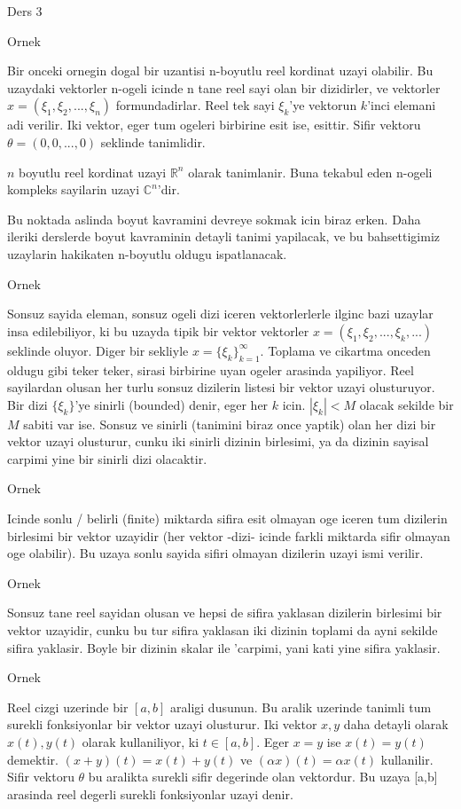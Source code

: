 \documentclass[12pt,fleqn]{article}\usepackage{../common}
\begin{document}
Ders 3

Ornek 

Bir onceki ornegin dogal bir uzantisi n-boyutlu reel kordinat uzayi
olabilir. Bu uzaydaki vektorler n-ogeli icinde n tane reel sayi olan bir
dizidirler, ve vektorler $x = (\xi_1, \xi_2,...,\xi_n)$
formundadirlar. Reel tek sayi $\xi_k$'ye vektorun $k$'inci elemani adi
verilir. Iki vektor, eger tum ogeleri birbirine esit ise, esittir. Sifir
vektoru $\theta = (0,0,...,0)$ seklinde tanimlidir. 

$n$ boyutlu reel kordinat uzayi $\mathbb{R}^n$ olarak tanimlanir. Buna tekabul eden
n-ogeli kompleks sayilarin uzayi $\mathbb{C}^n$'dir. 

Bu noktada aslinda boyut kavramini devreye sokmak icin biraz erken. Daha
ileriki derslerde boyut kavraminin detayli tanimi yapilacak, ve bu
bahsettigimiz uzaylarin hakikaten n-boyutlu oldugu ispatlanacak. 

Ornek 

Sonsuz sayida eleman, sonsuz ogeli dizi iceren vektorlerlerle ilginc bazi
uzaylar insa edilebiliyor, ki bu uzayda tipik bir vektor vektorler 
$x =
(\xi_1, \xi_2,...,\xi_k,...)$ seklinde oluyor. Diger bir sekliyle $x =
\{\xi_k\} _{k=1}^{\infty}$. 
Toplama ve cikartma onceden oldugu gibi teker teker, sirasi birbirine uyan
ogeler arasinda yapiliyor. Reel sayilardan olusan her turlu sonsuz
dizilerin listesi bir vektor uzayi olusturuyor. Bir dizi $\{\xi_k\}$'ye
sinirli (bounded) denir, eger her $k$ icin.  $|\xi_k| < M$ olacak sekilde
bir $M$ sabiti var ise. Sonsuz ve sinirli (tanimini biraz once yaptik) olan 
her dizi bir vektor uzayi olusturur, cunku iki sinirli dizinin birlesimi, ya
da dizinin sayisal carpimi yine bir sinirli dizi olacaktir. 

Ornek 

Icinde sonlu / belirli (finite) miktarda sifira esit olmayan oge iceren tum
dizilerin birlesimi bir vektor uzayidir (her vektor -dizi- icinde farkli
miktarda sifir olmayan oge olabilir). Bu uzaya sonlu sayida sifiri olmayan
dizilerin uzayi ismi verilir. 

Ornek

Sonsuz tane reel sayidan olusan ve hepsi de sifira yaklasan dizilerin
birlesimi bir vektor uzayidir, cunku bu tur sifira yaklasan iki dizinin
toplami da ayni sekilde sifira yaklasir. Boyle bir dizinin skalar ile
'carpimi, yani kati yine sifira yaklasir. 

Ornek 

Reel cizgi uzerinde bir $[a,b]$ araligi dusunun. Bu aralik uzerinde tanimli
tum surekli fonksiyonlar bir vektor uzayi olusturur. Iki vektor $x,y$ daha
detayli olarak $x(t),y(t)$ olarak kullaniliyor, ki $t \in [a,b]$. Eger $x =
y$ ise 
$x(t) = y(t)$ demektir. $(x+y)(t) = x(t) + y(t)$ ve $(\alpha x)(t) =
\alpha x(t)$ kullanilir. 
Sifir vektoru $\theta$ bu aralikta surekli sifir degerinde olan vektordur. 
Bu uzaya [a,b] arasinda reel degerli surekli fonksiyonlar uzayi denir. 
\end{document}
